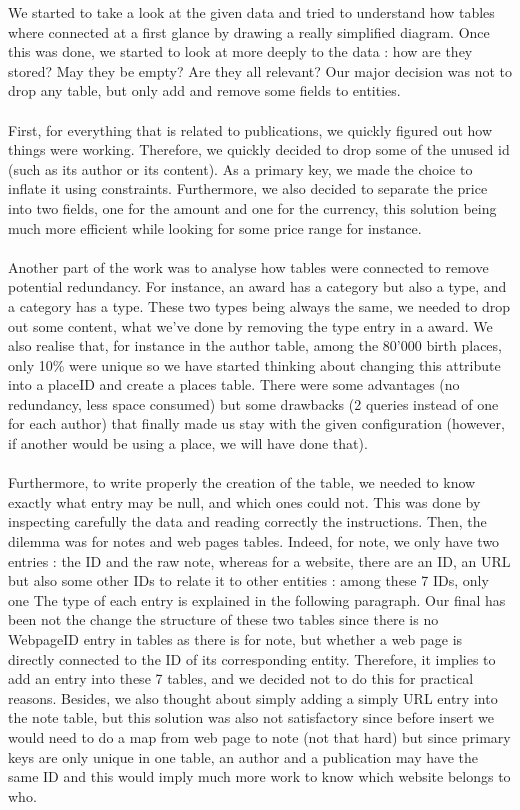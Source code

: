 \documentclass[doubleside, titlepage]{article}
\begin{document}
We started to take a look at the given data and tried to understand how tables where connected at a first glance by drawing a really simplified diagram. Once this was done, we started to look at more deeply to the data : how are they stored? May they be empty? Are they all relevant? Our major decision was not to drop any table, but only add and remove some fields to entities.
~\\~\\
First, for everything that is related to publications, we quickly figured out how things were working. Therefore, we quickly decided to drop some of the unused id (such as its author or its content). As a primary key, we made the choice to inflate it using constraints. Furthermore, we also decided to separate the price into two fields, one for the amount and one for the currency, this solution being much more efficient while looking for some price range for instance. 
~\\~\\
Another part of the work was to analyse how tables were connected to remove potential redundancy. For instance, an award has a category but also a type, and a category has a type. These two types being always the same, we needed to drop out some content, what we've done by removing the type entry in a award. We also realise that, for instance in the author table, among the 80'000 birth places, only 10\% were unique so we have started thinking about changing this attribute into a placeID and create a places table. There were some advantages (no redundancy, less space consumed) but some drawbacks (2 queries instead of one for each author) that finally made us stay with the given configuration (however, if another would be using a place, we will have done that).
~\\~\\
Furthermore, to write properly the creation of the table, we needed to know exactly what entry may be null, and which ones could not. This was done by inspecting carefully the data and reading correctly the instructions. Then, the dilemma was for notes and web pages tables. Indeed, for note, we only have two entries : the ID and the raw note, whereas for a website, there are an ID, an URL but also some other IDs to relate it to other entities : among these 7 IDs, only one   The type of each entry is explained in the following paragraph. Our final has been not the change the structure of these two tables since there is no WebpageID entry in tables as there is for note, but whether a web page is directly connected to the ID of its corresponding entity. Therefore, it implies to add an entry into these 7 tables, and we decided not to do this for practical reasons. Besides, we also thought about simply adding a simply URL entry into the note table, but this solution was also not satisfactory since before insert we would need to do a map from web page to note (not that hard) but since primary keys are only unique in one table, an author and a publication may have the same ID and this would imply much more work to know which website belongs to who.
\end{document}
